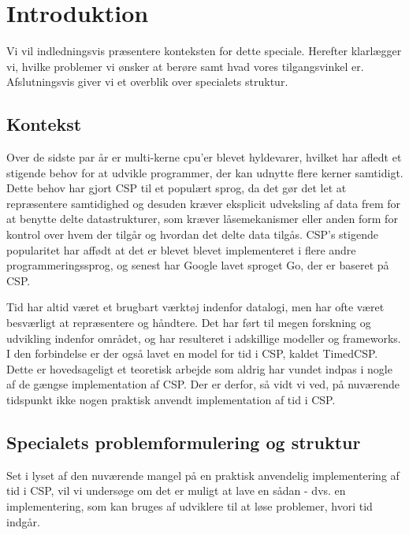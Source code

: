 \chapter{Introduktion}
\thispagestyle{empty}
Vi vil indledningsvis præsentere konteksten for dette speciale. Herefter klarlægger vi, hvilke problemer vi ønsker at berøre samt hvad vores tilgangsvinkel er. Afslutningsvis giver vi et overblik over specialets struktur. 

\section{Kontekst}
Over de sidste par år er multi-kerne cpu'er blevet hyldevarer, hvilket har afledt et stigende behov for at udvikle programmer, der kan udnytte flere kerner samtidigt. Dette behov har gjort CSP til et populært sprog, da det gør det let at repræsentere samtidighed og desuden kræver eksplicit udveksling af data frem for at benytte delte datastrukturer, som kræver låsemekanismer eller anden form for kontrol over hvem der tilgår og hvordan det delte data tilgås. CSP's stigende popularitet har affødt at det er blevet blevet implementeret i flere andre programmeringssprog, og senest har Google lavet sproget Go, der er baseret på CSP. 

Tid har altid været et brugbart værktøj indenfor datalogi, men har ofte været besværligt at repræsentere og håndtere. Det har ført til megen forskning og udvikling indenfor området, og har resulteret i adskillige modeller og frameworks. I den forbindelse er der også lavet en model for tid i CSP, kaldet TimedCSP. Dette er hovedsageligt et teoretisk arbejde som aldrig har vundet indpas i nogle af de gængse implementation af CSP. Der er derfor, så vidt vi ved, på nuværende tidspunkt ikke nogen praktisk anvendt implementation af tid i CSP. 

\section{Specialets problemformulering og struktur}
Set i lyset af den nuværende mangel på en praktisk anvendelig implementering af tid i CSP, vil vi undersøge om det er muligt at lave en sådan - dvs. en implementering, som kan bruges af udviklere til at løse problemer, hvori tid indgår.

